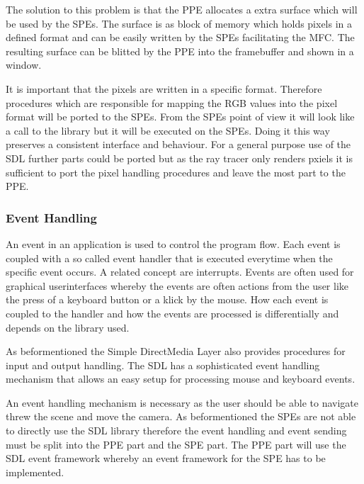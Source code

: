 \documentclass[DIV10, abstracton, openright, footsepline, headsepline, twoside, 9pt,
bigheadings]{scrreprt}
\begin{document}
The solution to this problem is that the PPE allocates a extra surface which will
be used by the SPEs. The surface is as block of memory which holds pixels in a
defined format and can be easily written by the SPEs facilitating the MFC.
The resulting surface can be blitted by the PPE into the framebuffer and shown in
a window.

It is important that the pixels are written in a specific format. Therefore procedures
which are responsible for mapping the RGB values into the pixel format will be ported
to the SPEs.  From the SPEs point of view it will look like a call to the library but
it will be executed on the SPEs. Doing it this way preserves a consistent interface
and behaviour. For a general purpose use of the SDL further parts could be ported
but as the ray tracer only renders pxiels it is sufficient to port the pixel handling
procedures and leave the most part to the PPE.


\subsubsection{Event Handling}

An event in an application is used to control the program flow. Each event is coupled
with a so called event handler that is executed everytime when the specific event occurs.
A related concept are interrupts. Events are often used for graphical userinterfaces whereby
the events are often actions from the user like the press of a keyboard button or a klick
by the mouse. How each event is coupled to the handler and how the events are processed is
differentially and depends on the library used.

As beformentioned the Simple DirectMedia Layer also provides procedures for input
and output handling. The SDL has a sophisticated event handling mechanism that allows
an easy setup for processing mouse and keyboard events.

An event handling mechanism is necessary as the user should be able to navigate threw
the scene and move the camera. As beformentioned the SPEs are not able to directly
use the SDL library therefore the event handling and event sending must be split
into the PPE part and the SPE part. The PPE part will use the SDL event framework
whereby an event framework for the SPE has to be implemented.
\end{document}
